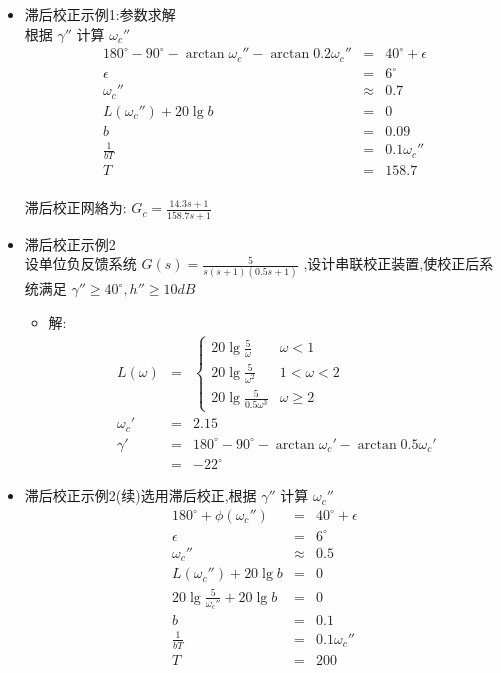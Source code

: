 \documentclass[table]{article}
\begin{document}
\begin{frame}
\begin{itemize}
\begin{itemize}
\item 滞后校正示例1:参数求解\\
\label{sec-2-2-10-2-2}%
根据  $\gamma''$  计算  $\omega_c''$ 
\begin{eqnarray*}
180^{\circ}-90^{\circ}-\arctan\omega_c''-\arctan0.2\omega_c'' & = & 40^{\circ}+\epsilon\\
\epsilon &=& 6^{\circ} \\
\omega_c'' &\approx& 0.7 \\
L(\omega_c'') +20\lg b&=& 0 \\
b &=& 0.09 \\
\frac{1}{bT} &=& 0.1\omega_c''\\
T &=& 158.7 \\
\end{eqnarray*}

滞后校正网絡为:  $G_c=\frac{14.3s+1}{158.7s+1}$ 


\item 滞后校正示例2\\
\label{sec-2-2-10-2-3}%
设单位负反馈系统  $G(s)=\frac{5}{s(s+1)(0.5s+1)}$  ,设计串联校正装置,使校正后系统满足 $\gamma''\geq 40^{\circ}, h''\geq 10dB$ 

\begin{itemize}
\item <2->解:
      \begin{eqnarray*}
      L(\omega) & = & \begin{cases} 20\lg\frac{5}{\omega} & \omega <1\\
                                    20\lg\frac{5}{\omega^2} & 1<\omega<2 \\
                                    20\lg\frac{5}{0.5\omega^3} & \omega\geq 2 \end{cases}\\
      \omega_c' &=& 2.15 \\
      \gamma' &=& 180^{\circ}-90^{\circ}-\arctan\omega_c'-\arctan0.5\omega_c' \\
       &=& -22^{\circ} 
      \end{eqnarray*}
\end{itemize}


\item 滞后校正示例2(续)选用滞后校正,根据  $\gamma''$  计算  $\omega_c''$\\
\label{sec-2-2-10-2-4}%
\begin{eqnarray*}
180^{\circ}+\phi(\omega_c'') & = & 40^{\circ}+\epsilon\\
\epsilon &=& 6^{\circ} \\
\omega_c'' &\approx& 0.5 \\
L(\omega_c'') +20\lg b &=& 0 \\
20\lg\frac{5}{\omega_c''} +20\lg b &=& 0\\
b &=& 0.1 \\
\frac{1}{bT} &=& 0.1\omega_c'' \\
T &=& 200
\end{eqnarray*}



\end{itemize}
\end{itemize}
\end{frame}
\end{document}
